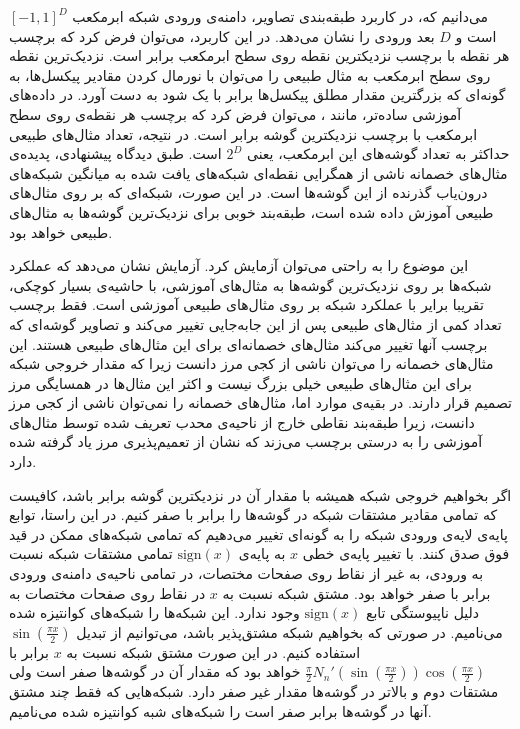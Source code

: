\documentclass[12pt,onecolumn,a4paper]{article}
\begin{document}
می‌دانیم که، در کاربرد طبقه‌بندی تصاویر، دامنه‌ی ورودی شبکه ابرمکعب $[-1,1]^D$ است و $D$ بعد ورودی را نشان می‌دهد. در این کاربرد، می‌توان فرض کرد که برچسب هر نقطه با برچسب نزدیکترین نقطه روی سطح ابرمکعب برابر است. نزدیک‌ترین نقطه روی سطح ابرمکعب به مثال طبیعی را می‌توان با نورمال کردن مقادیر پیکسل‌ها، به گونه‌ای که بزرگترین مقدار مطلق پیکسل‌ها برابر با یک شود به دست آورد. در داده‌های آموزشی ساده‌تر، مانند 
، 
می‌توان فرض کرد که برچسب هر نقطه‌ی روی سطح ابرمکعب با برچسب نزدیکترین گوشه برابر است. در نتیجه، تعداد مثال‌های طبیعی حداکثر به تعداد گوشه‌های این ابرمکعب، یعنی $2^D$ است. طبق دیدگاه پیشنهادی، پدیده‌ی مثال‌های خصمانه ناشی از همگرایی نقطه‌ای شبکه‌ها‌ی یافت شده به میانگین شبکه‌های درون‌یاب گذرنده از این گوشه‌ها است. در این صورت، شبکه‌ای که بر روی مثال‌های طبیعی آموزش داده شده است،  طبقه‌بند خوبی برای نزدیک‌ترین گوشه‌ها به مثال‌های طبیعی خواهد بود. 

 این موضوع را به راحتی می‌توان آزمایش کرد. آزمایش نشان می‌دهد که عملکرد شبکه‌ها بر روی نزدیک‌ترین گوشه‌ها به مثال‌های آموزشی، با حاشیه‌ی بسیار کوچکی، تقریبا برایر با عملکرد شبکه بر روی مثال‌های طبیعی آموزشی است. فقط برچسب تعداد کمی از مثال‌های طبیعی پس از این جابه‌جایی تغییر می‌کند و تصاویر گوشه‌ای که برچسب آنها تغییر می‌کند مثال‌های خصمانه‌ای برای این مثال‌های طبیعی هستند. این مثال‌های خصمانه را می‌توان ناشی از کجی مرز دانست زیرا که مقدار خروجی شبکه برای این مثال‌های طبیعی خیلی بزرگ نیست و اکثر این مثال‌ها در همسایگی مرز تصمیم قرار دارند. در بقیه‌ی موارد اما، مثال‌های خصمانه را نمی‌توان ناشی از کجی مرز دانست، زیرا طبقه‌بند نقاطی خارج از ناحیه‌ی محدب تعریف شده توسط مثال‌های آموزشی را به درستی برچسب می‌زند که نشان از تعمیم‌پذیری مرز یاد گرفته شده دارد.

اگر بخواهیم خروجی شبکه همیشه با مقدار آن در نزدیکترین گوشه برابر باشد، کافیست که تمامی مقادیر مشتقات شبکه در گوشه‌ها را برابر با صفر کنیم. در این راستا، توابع پایه‌ی لایه‌ی ورودی شبکه را به گونه‌ای تغییر می‌دهیم که تمامی شبکه‌های ممکن در قید فوق صدق کنند. با تغییر پایه‌ی خطی $x$ به پایه‌ی $\mathrm{sign}(x)$ تمامی مشتقات شبکه نسبت به ورودی، به غیر از نقاط روی صفحات مختصات، در تمامی ناحیه‌ی دامنه‌ی ورودی برابر با صفر خواهد بود. مشتق شبکه نسبت به $x$ در نقاط روی صفحات مختصات به دلیل ناپیوستگی تابع $\mathrm{sign}(x)$ وجود ندارد. این شبکه‌ها را شبکه‌های کوانتیزه شده می‌نامیم. در صورتی که بخواهیم شبکه مشتق‌پذیر باشد، می‌توانیم از تبدیل $\sin(\frac{\pi x}{2})$ استفاده کنیم. در این صورت مشتق شبکه نسبت به $x$ برابر با $\frac{\pi}{2}N_n'(\sin(\frac{\pi x}{2}))\cos(\frac{\pi x}{2})$ خواهد بود که مقدار آن در گوشه‌ها صفر است ولی مشتقات دوم و بالاتر در گوشه‌ها مقدار غیر صفر دارد. شبکه‌هایی که فقط چند مشتق آنها در گوشه‌ها برابر صفر است را شبکه‌های شبه کوانتیزه شده می‌نامیم.
\end{document}
